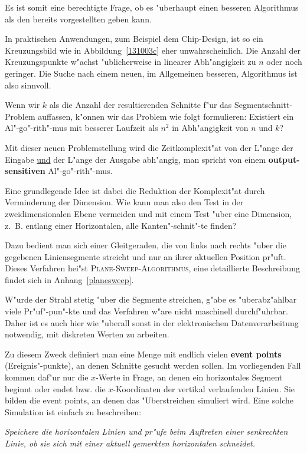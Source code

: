 \documentclass[draft,12pt]{scrreprt}
\theoremstyle{break}
\begin{document}
Es ist somit eine berechtigte Frage, ob es "uberhaupt einen besseren
Algorithmus als den bereits vorgestellten geben kann.

In praktischen Anwendungen, zum Beispiel dem Chip-Design, ist so ein
Kreuzungsbild wie in Abbildung~\ref{131003c} eher unwahrscheinlich. Die
Anzahl der Kreuzungspunkte w"achst "ublicherweise in linearer
Abh"angigkeit zu $n$ oder noch geringer. Die Suche nach einem neuen, im
Allgemeinen besseren, Algorithmus ist also sinnvoll.

Wenn wir $k$ als die Anzahl der resultierenden Schnitte f"ur das
Segmentschnitt-Problem auffassen, k"onnen wir das Problem wie folgt
formulieren: Existiert ein Al"-go"-rith"-mus mit besserer Laufzeit als $n^2$ in 
Abh"angigkeit von $n$ und $k$?

Mit dieser neuen Problemstellung wird die Zeitkomplexit"at von der L"ange
der Eingabe \underline{und} der L"ange der Ausgabe abh"angig, man spricht
von einem \textbf{output-sensitiven} Al"-go"-rith"-mus.

Eine grundlegende Idee ist dabei die Reduktion der Komplexit"at durch
Verminderung der Dimension. Wie kann man also den Test in der
zweidimensionalen Ebene vermeiden und mit einem Test "uber eine
Dimension, z.~B. entlang einer Horizontalen, alle Kanten"-schnit"-te
finden?

Dazu bedient man sich einer Gleitgeraden, die von links nach rechts
"uber die gegebenen Liniensegmente streicht und nur an ihrer aktuellen
Position pr"uft. Dieses Verfahren hei"st \textsc{Plane-Sweep-Algorithmus},
eine detaillierte Beschreibung findet sich in Anhang~\ref{planesweep}.

W"urde der Strahl stetig "uber die Segmente streichen, g"abe es
"uberabz"ahlbar viele Pr"uf"-pun"-kte und das Verfahren w"are nicht maschinell
durchf"uhrbar. Daher ist es auch hier wie "uberall sonst in der
elektronischen Datenverarbeitung notwendig, mit diskreten Werten zu
arbeiten.
 
Zu diesem Zweck definiert man eine Menge mit endlich vielen \textbf{event
points} (Ereignis"-punkte), an denen Schnitte gesucht werden sollen. Im
vorliegenden Fall kommen daf"ur nur die $x$-Werte in Frage, an denen ein
horizontales Segment beginnt oder endet bzw. die $x$-Koordinaten der
vertikal verlaufenden Linien. Sie bilden die event points, an denen das
"Uberstreichen simuliert wird. Eine solche Simulation ist einfach zu
beschreiben:

\textit{Speichere die horizontalen Linien und pr"ufe beim Auftreten einer
senkrechten Linie, ob sie sich mit einer aktuell gemerkten horizontalen
schneidet.}
\end{document}
